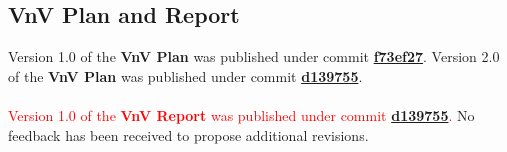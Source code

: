 \documentclass{article}
\begin{document}
\subsection{VnV Plan and Report}
\noindent Version 1.0 of the \textbf{VnV Plan} was published under commit \href{https://github.com/KiranSingh15/CAS-741-Image-Correspondences/commit/f73ef273ec0e440c47bb849f142982482d895bc0}{\textbf{f73ef27}}. Version 2.0 of the \textbf{VnV Plan} was published under commit \href{https://github.com/KiranSingh15/CAS-741-Image-Correspondences/commit/d139755d96b3c7b316cd7f96106ef69df3ab228a}{\textbf{d139755}}.\\ \\

\noindent \textcolor{red}{Version 1.0 of the \textbf{VnV Report} was published under commit \href{https://github.com/KiranSingh15/CAS-741-Image-Correspondences/commit/d139755d96b3c7b316cd7f96106ef69df3ab228a}{\textbf{d139755}}.} No feedback has been received to propose additional revisions.
\end{document}

